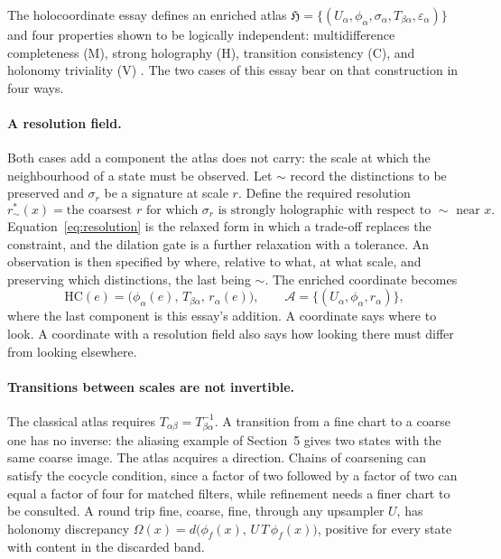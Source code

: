 \documentclass[11pt]{article}
\theoremstyle{definition}
\theoremstyle{remark}
\begin{document}
The holocoordinate essay defines an enriched atlas $\mathfrak H=\{(U_\alpha,\phi_\alpha,\sigma_\alpha,T_{\beta\alpha},\varepsilon_\alpha)\}$ and four properties shown to be logically independent: multidifference completeness (M), strong holography (H), transition consistency (C), and holonomy triviality (V) \cite{holo}. The two cases of this essay bear on that construction in four ways.

\paragraph{A resolution field.} Both cases add a component the atlas does not carry: the scale at which the neighbourhood of a state must be observed. Let $\sim$ record the distinctions to be preserved and $\sigma_r$ be a signature at scale $r$. Define the required resolution
\[
  r^{*}_{\sim}(x)=\text{the coarsest } r \text{ for which } \sigma_r \text{ is strongly holographic with respect to } \sim \text{ near } x.
\]
Equation~\eqref{eq:resolution} is the relaxed form in which a trade-off replaces the constraint, and the dilation gate is a further relaxation with a tolerance. An observation is then specified by where, relative to what, at what scale, and preserving which distinctions, the last being $\sim$. The enriched coordinate becomes
\begin{equation}
  \mathrm{HC}(e)=\big(\phi_\alpha(e),\,T_{\beta\alpha},\,r_\alpha(e)\big),\qquad \mathcal A=\{(U_\alpha,\phi_\alpha,r_\alpha)\},
  \label{eq:holocoord}
\end{equation}
where the last component is this essay's addition. A coordinate says where to look. A coordinate with a resolution field also says how looking there must differ from looking elsewhere.

\paragraph{Transitions between scales are not invertible.} The classical atlas requires $T_{\alpha\beta}=T_{\beta\alpha}^{-1}$. A transition from a fine chart to a coarse one has no inverse: the aliasing example of Section~5 gives two states with the same coarse image. The atlas acquires a direction. Chains of coarsening can satisfy the cocycle condition, since a factor of two followed by a factor of two can equal a factor of four for matched filters, while refinement needs a finer chart to be consulted. A round trip fine, coarse, fine, through any upsampler $U$, has holonomy discrepancy $\Omega(x)=d\big(\phi_f(x),\,U\,T\,\phi_f(x)\big)$, positive for every state with content in the discarded band.
\end{document}

